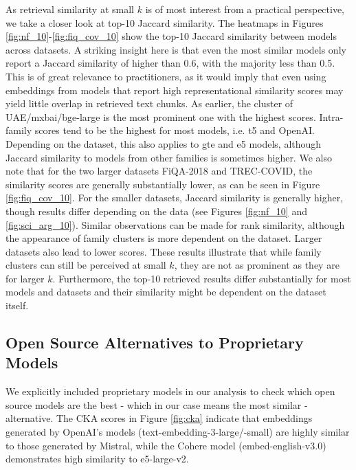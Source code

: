 \documentclass[nonacm,sigconf]{acmart}
\begin{document}
As retrieval similarity at small $k$ is of most interest from a practical perspective, we take a closer look at top-10 Jaccard similarity. The heatmaps in Figures \ref{fig:nf_10}-\ref{fig:fiq_cov_10} show the top-10 Jaccard similarity between models across datasets. A striking insight here is that even the most similar models only report a Jaccard similarity of higher than 0.6, with the majority less than 0.5. This is of great relevance to practitioners, as it would imply that even using embeddings from models that report high representational similarity scores may yield little overlap in retrieved text chunks. As earlier, the cluster of UAE/mxbai/bge-large is the most prominent one with the highest scores. Intra-family scores tend to be the highest for most models, i.e. t5 and OpenAI. Depending on the dataset, this also applies to gte and e5 models, although Jaccard similarity to models from other families is sometimes higher. We also note that for the two larger datasets FiQA-2018 and TREC-COVID, the similarity scores are generally substantially lower, as can be seen in Figure \ref{fig:fiq_cov_10}. For the smaller datasets, Jaccard similarity is generally higher, though results differ depending on the data (see Figures \ref{fig:nf_10} and \ref{fig:sci_arg_10}). Similar observations can be made for rank similarity, although the appearance of family clusters is more dependent on the dataset. Larger datasets also lead to lower scores. These results illustrate that while family clusters can still be perceived at small $k$, they are not as prominent as they are for larger $k$. Furthermore, the top-10 retrieved results differ substantially for most models and datasets and their similarity might be dependent on the dataset itself.

\subsection{Open Source Alternatives to Proprietary Models}

We explicitly included proprietary models in our analysis to check which open source models are the best - which in our case means the most similar - alternative. The CKA scores in Figure \ref{fig:cka} indicate that embeddings generated by OpenAI's models (text-embedding-3-large/-small) are highly similar to those generated by Mistral, while the Cohere model (embed-english-v3.0) demonstrates high similarity to e5-large-v2.

\begin{figure*}
    \centering
    \caption{Jaccard similarity for the top-10 retrieved text chunks averaged over 25 queries on SciFact (a) and ArguAna (b). The UAE and mxbai models show high levels of similarity along with bge-large. The remaining models tend to show the highest similarity within their own family with the exception of the bge/gte inter-family cluster.}
    \label{fig:sci_arg_10}
\end{figure*}
\end{document}
